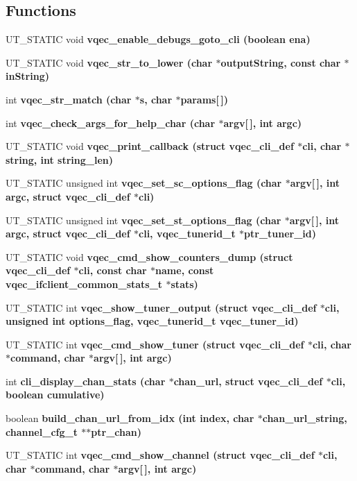 \subsection*{Functions}
\begin{CompactItemize}
\item 
UT\_\-STATIC void \bf{vqec\_\-enable\_\-debugs\_\-goto\_\-cli} (boolean ena)
\item 
UT\_\-STATIC void \bf{vqec\_\-str\_\-to\_\-lower} (char $\ast$output\-String, const char $\ast$in\-String)
\item 
int \bf{vqec\_\-str\_\-match} (char $\ast$s, char $\ast$params[$\,$])
\item 
int \bf{vqec\_\-check\_\-args\_\-for\_\-help\_\-char} (char $\ast$argv[$\,$], int argc)
\item 
UT\_\-STATIC void \bf{vqec\_\-print\_\-callback} (struct \bf{vqec\_\-cli\_\-def} $\ast$cli, char $\ast$string, int string\_\-len)
\item 
UT\_\-STATIC unsigned int \bf{vqec\_\-set\_\-sc\_\-options\_\-flag} (char $\ast$argv[$\,$], int argc, struct \bf{vqec\_\-cli\_\-def} $\ast$cli)
\item 
UT\_\-STATIC unsigned int \bf{vqec\_\-set\_\-st\_\-options\_\-flag} (char $\ast$argv[$\,$], int argc, struct \bf{vqec\_\-cli\_\-def} $\ast$cli, vqec\_\-tunerid\_\-t $\ast$ptr\_\-tuner\_\-id)
\item 
UT\_\-STATIC void \bf{vqec\_\-cmd\_\-show\_\-counters\_\-dump} (struct \bf{vqec\_\-cli\_\-def} $\ast$cli, const char $\ast$name, const \bf{vqec\_\-ifclient\_\-common\_\-stats\_\-t} $\ast$stats)
\item 
UT\_\-STATIC int \bf{vqec\_\-show\_\-tuner\_\-output} (struct \bf{vqec\_\-cli\_\-def} $\ast$cli, unsigned int options\_\-flag, vqec\_\-tunerid\_\-t vqec\_\-tuner\_\-id)
\item 
UT\_\-STATIC int \bf{vqec\_\-cmd\_\-show\_\-tuner} (struct \bf{vqec\_\-cli\_\-def} $\ast$cli, char $\ast$command, char $\ast$argv[$\,$], int argc)
\item 
int \bf{cli\_\-display\_\-chan\_\-stats} (char $\ast$chan\_\-url, struct \bf{vqec\_\-cli\_\-def} $\ast$cli, boolean cumulative)
\item 
boolean \bf{build\_\-chan\_\-url\_\-from\_\-idx} (int index, char $\ast$chan\_\-url\_\-string, channel\_\-cfg\_\-t $\ast$$\ast$ptr\_\-chan)
\item 
UT\_\-STATIC int \bf{vqec\_\-cmd\_\-show\_\-channel} (struct \bf{vqec\_\-cli\_\-def} $\ast$cli, char $\ast$command, char $\ast$argv[$\,$], int argc)
\item 
$$
\end{CompactItemize}
